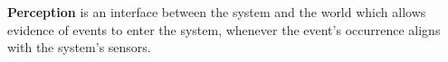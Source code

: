 

\begin{defn}%
\label{def:perception}
\hypertarget{def:perception}{}\textbf{Perception} is an interface
between the system and the world which allows evidence of events to
enter the system, whenever the event's occurrence aligns with the
system's sensors.
\end{defn}



